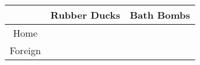 \begin{table}[ht]
    \centering
    \begin{tabular}{|c|c|c|}
    \hline
     & Rubber Ducks & Bath Bombs \\
    \hline
    Home &  &  \\
    \hline
    Foreign &  &  \\
    \hline
    \end{tabular}
\end{table}